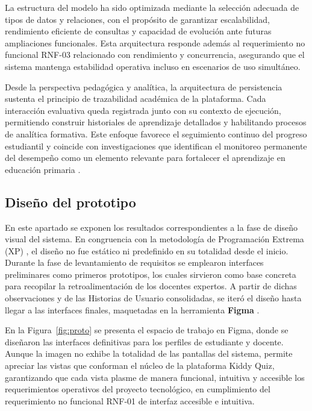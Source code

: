 La estructura del modelo ha sido optimizada mediante la selección adecuada de tipos de datos y relaciones, con el propósito de garantizar escalabilidad, rendimiento eficiente de consultas y capacidad de evolución ante futuras ampliaciones funcionales. Esta arquitectura responde además al requerimiento no funcional RNF-03 relacionado con rendimiento y concurrencia, asegurando que el sistema mantenga estabilidad operativa incluso en escenarios de uso simultáneo.

Desde la perspectiva pedagógica y analítica, la arquitectura de persistencia sustenta el principio de trazabilidad académica de la plataforma. Cada interacción evaluativa queda registrada junto con su contexto de ejecución, permitiendo construir historiales de aprendizaje detallados y habilitando procesos de analítica formativa. Este enfoque favorece el seguimiento continuo del progreso estudiantil y coincide con investigaciones que identifican el monitoreo permanente del desempeño como un elemento relevante para fortalecer el aprendizaje en educación primaria \cite{faber2017dfa,tirado2025bridge,rodriguez2023personalised}.

\subsection{Diseño del prototipo}

En este apartado se exponen los resultados correspondientes a la fase de diseño visual del sistema. En congruencia con la metodología de Programación Extrema (XP) \cite{beck2004xp}, el diseño no fue estático ni predefinido en su totalidad desde el inicio. Durante la fase de levantamiento de requisitos se emplearon interfaces preliminares como primeros prototipos, los cuales sirvieron como base concreta para recopilar la retroalimentación de los docentes expertos. A partir de dichas observaciones y de las Historias de Usuario consolidadas, se iteró el diseño hasta llegar a las interfaces finales, maquetadas en la herramienta \textbf{Figma}
\cite{vlachogianni2022sus}.

En la Figura~\ref{fig:proto} se presenta el espacio de trabajo en Figma, donde se diseñaron las interfaces definitivas para los perfiles de estudiante y docente. Aunque la imagen no exhibe la totalidad de las pantallas del sistema, permite apreciar las vistas que conforman el núcleo de la plataforma Kiddy Quiz, garantizando que cada vista plasme de manera funcional, intuitiva y accesible los requerimientos operativos del proyecto tecnológico, en cumplimiento del requerimiento no funcional RNF-01 de interfaz accesible e intuitiva.

